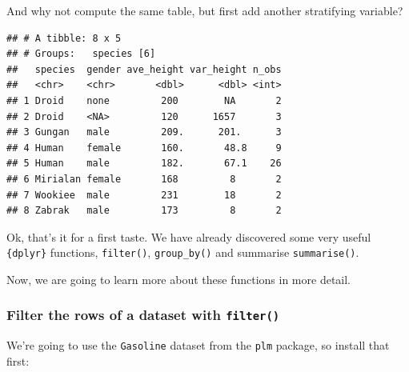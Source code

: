 \documentclass[]{gitbook}
\newenvironment{Shaded}{\begin{snugshade}}{\end{snugshade}}
\newcommand{\DataTypeTok}[1]{\textcolor[rgb]{0.13,0.29,0.53}{#1}}
\newcommand{\DecValTok}[1]{\textcolor[rgb]{0.00,0.00,0.81}{#1}}
\newcommand{\KeywordTok}[1]{\textcolor[rgb]{0.13,0.29,0.53}{\textbf{#1}}}
\newcommand{\NormalTok}[1]{#1}
\newcommand{\OperatorTok}[1]{\textcolor[rgb]{0.81,0.36,0.00}{\textbf{#1}}}
\newcommand{\OtherTok}[1]{\textcolor[rgb]{0.56,0.35,0.01}{#1}}
\newcommand{\StringTok}[1]{\textcolor[rgb]{0.31,0.60,0.02}{#1}}
\theoremstyle{definition}
\theoremstyle{definition}
\theoremstyle{definition}
\theoremstyle{remark}
\begin{document}
And why not compute the same table, but first add another stratifying
variable?

\begin{Shaded}
\end{Shaded}

\begin{verbatim}
## # A tibble: 8 x 5
## # Groups:   species [6]
##   species  gender ave_height var_height n_obs
##   <chr>    <chr>       <dbl>      <dbl> <int>
## 1 Droid    none         200        NA       2
## 2 Droid    <NA>         120      1657       3
## 3 Gungan   male         209.      201.      3
## 4 Human    female       160.       48.8     9
## 5 Human    male         182.       67.1    26
## 6 Mirialan female       168         8       2
## 7 Wookiee  male         231        18       2
## 8 Zabrak   male         173         8       2
\end{verbatim}

Ok, that's it for a first taste. We have already discovered some very
useful \texttt{\{dplyr\}} functions, \texttt{filter()},
\texttt{group\_by()} and summarise \texttt{summarise()}.

Now, we are going to learn more about these functions in more detail.

\hypertarget{filter-the-rows-of-a-dataset-with-filter}{%
\subsubsection{\texorpdfstring{Filter the rows of a dataset with
\texttt{filter()}}{Filter the rows of a dataset with filter()}}\label{filter-the-rows-of-a-dataset-with-filter}}

We're going to use the \texttt{Gasoline} dataset from the \texttt{plm}
package, so install that first:
\end{document}
